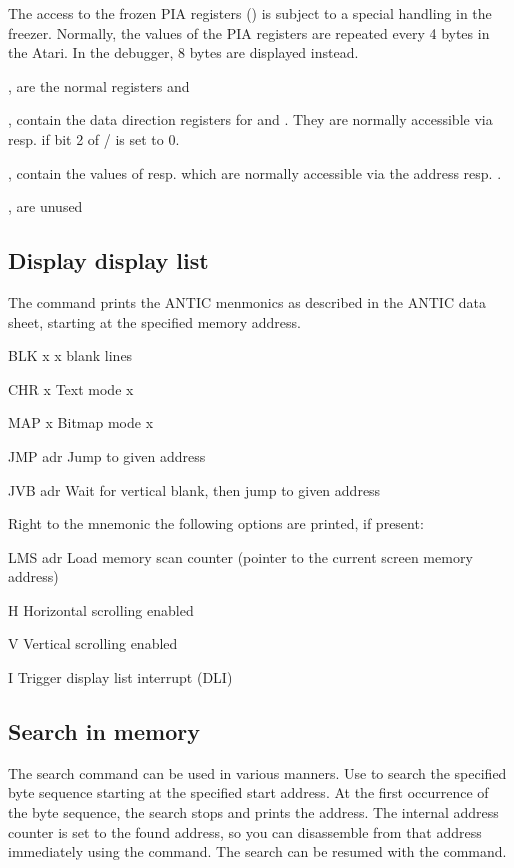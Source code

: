 The access to the frozen PIA registers () is subject to a special
handling in the freezer. Normally, the values of the PIA registers are repeated
every 4 bytes in the Atari. In the debugger, 8 bytes are displayed instead.
\begin{flist}
\item[\fhex{D300}, \fhex{D301}]
are the normal registers  and 
\item[\fhex{D302}, \fhex{D303}]
contain the data direction registers for  and .
They are normally accessible via  resp.  if bit 2
of  /  is set to 0.
\item[\fhex{D304}, \fhex{D305}]
contain the values of  resp.  which are normally
accessible via the address resp. .
\item[\fhex{D306}, \fhex{D307}]
are unused
\end{flist}

\subsection{Display display list}
The  command prints the ANTIC menmonics as described in the ANTIC data
sheet, starting at the specified memory address.
\begin{fcmdlist}
\item[BLK x] x blank lines
\item[CHR x] Text mode x
\item[MAP x] Bitmap mode x
\item[JMP adr] Jump to given address
\item[JVB adr] Wait for vertical blank, then jump to given address
\end{fcmdlist}
Right to the mnemonic the following options are printed, if present:
\begin{fcmdlist}
\item[LMS adr] Load memory scan counter (pointer to the current screen memory
address)
\item[H] Horizontal scrolling enabled
\item[V] Vertical scrolling enabled
\item[I] Trigger display list interrupt (DLI)
\end{fcmdlist}

\subsection{Search in memory}
The search command can be used in various manners. Use
 to search the specified byte sequence starting
at the specified start address. At the first occurrence of the byte sequence,
the search stops and prints the address. The internal address counter is set to
the found address, so you can disassemble from that address immediately using
the  command. The search can be resumed with the \fcmd{/} command.

